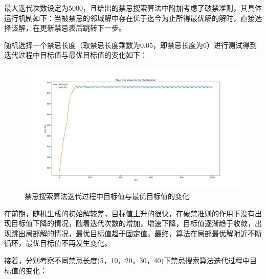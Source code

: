 \documentclass{article}
\begin{document}
    最大迭代次数设定为5000，且给出的禁忌搜索算法中附加考虑了破禁准则，其具体运行机制如下：当被禁忌的邻域解中存在优于迄今为止所得最优解的解时，直接选择该解，在更新禁忌表后跳转下一步。

    随机选择一个禁忌长度（取禁忌长度乘数为0.05，即禁忌长度为6）进行测试得到迭代过程中目标值与最优目标值的变化如下：
    \begin{figure}[H]
        \centering
        \includegraphics[width=\textwidth]{./image/tabu6.png}
        \caption{禁忌搜索算法迭代过程中目标值与最优目标值的变化}
    \end{figure}

    在前期，随机生成的初始解较差，目标值上升的很快，在破禁准则的作用下没有出现目标值下降的情况，随着迭代次数的增加，增速下降，目标值逐渐趋于收敛，出现跳出局部解的情况，最优目标值趋于固定值。最终，算法在局部最优解附近不断循环，最优目标值不再发生变化。

    接着，分别考察不同禁忌长度(5，10，20，30，40)下禁忌搜索算法迭代过程中目标值的变化：
\end{document}
